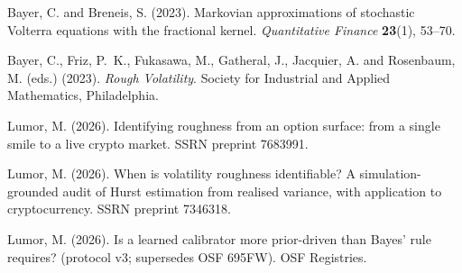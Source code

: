  Bayer, C. and Breneis, S. (2023).
Markovian approximations of stochastic Volterra equations with the
fractional kernel. \emph{Quantitative Finance} \textbf{23}(1), 53--70.

 Bayer, C., Friz, P.~K., Fukasawa, M., Gatheral, J.,
Jacquier, A. and Rosenbaum, M. (eds.) (2023). \emph{Rough Volatility}.
Society for Industrial and Applied Mathematics, Philadelphia.

 Lumor, M. (2026). Identifying roughness from an option
surface: from a single smile to a live crypto market. SSRN preprint 7683991.

 Lumor, M. (2026). When is volatility roughness
identifiable? A simulation-grounded audit of Hurst estimation from realised
variance, with application to cryptocurrency. SSRN preprint 7346318.

 Lumor, M. (2026). Is a learned calibrator more
prior-driven than Bayes' rule requires? (protocol v3; supersedes OSF 695FW).
OSF Registries.

